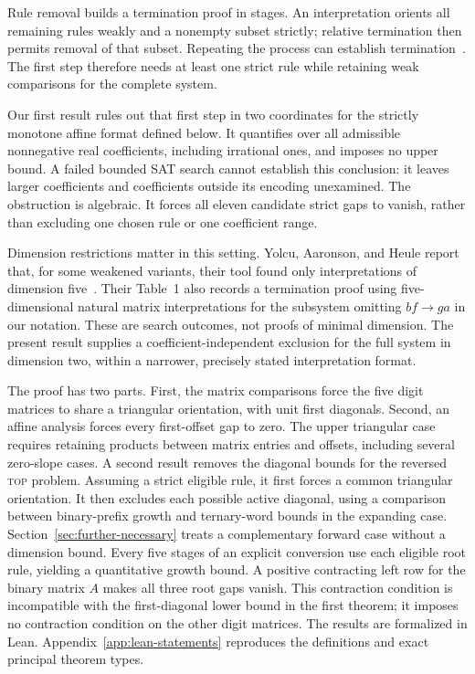 \documentclass[11pt,a4paper]{article}
\begin{document}
Rule removal builds a termination proof in stages. An interpretation
orients all remaining rules weakly and a nonempty subset strictly;
relative termination then permits removal of that subset. Repeating
the process can establish termination~\cite[Theorems~2.6 and~2.15]{yah}.
The first step therefore needs at least one strict rule while retaining
weak comparisons for the complete system.

Our first result rules out that first step in two coordinates for the
strictly monotone affine format defined below. It quantifies over all
admissible nonnegative real coefficients, including irrational ones,
and imposes no upper bound. A failed bounded SAT search cannot establish
this conclusion: it leaves larger coefficients and coefficients outside
its encoding unexamined. The obstruction is algebraic. It forces all
eleven candidate strict gaps to vanish, rather than excluding one
chosen rule or one coefficient range.

Dimension restrictions matter in this setting. Yolcu, Aaronson, and
Heule report that, for some weakened variants, their tool found only
interpretations of dimension five~\cite[Section~1]{yah}. Their Table~1 also
records a termination proof using five-dimensional natural matrix
interpretations for the subsystem omitting \(bf\to ga\) in our notation.
These are search outcomes, not proofs
of minimal dimension. The present result supplies a coefficient-independent
exclusion for the full system in dimension two, within a narrower,
precisely stated interpretation format.

The proof has two parts. First, the matrix comparisons force the five
digit matrices to share a triangular orientation, with unit first
diagonals. Second, an affine analysis forces every first-offset gap to
zero. The upper triangular case requires retaining products between
matrix entries and offsets, including several zero-slope cases.
A second result removes the diagonal bounds for the reversed
\textsc{top} problem. Assuming a strict eligible rule, it first forces
a common triangular orientation. It then excludes each possible
active diagonal, using a comparison between binary-prefix growth and
ternary-word bounds in the expanding case.
Section~\ref{sec:further-necessary} treats a complementary forward
case without a dimension bound. Every five stages of an explicit
conversion use each eligible root rule, yielding a quantitative growth
bound. A positive contracting left row for the binary matrix $A$
makes all three root gaps vanish. This contraction condition is
incompatible with the first-diagonal lower bound in the first theorem;
it imposes no contraction condition on the other digit matrices.
The results are formalized in Lean.
Appendix~\ref{app:lean-statements} reproduces the definitions and
exact principal theorem types.
\end{document}
